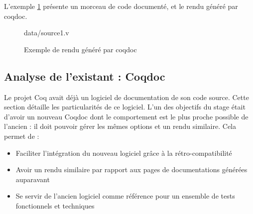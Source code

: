 \documentclass[a4paper, 11pt]{report}
\begin{document}
    L'exemple \cref{fig1} présente un morceau de code documenté, et le rendu
    généré par coqdoc.

    \begin{figure}
      
        {data/source1.v}
      \caption{Exemple de rendu généré par coqdoc}
      \label{fig1}
    \end{figure}

    \clearpage

    \subsection{Analyse de l'existant : Coqdoc}
    Le projet Coq avait déjà un logiciel de documentation de son code source.
    Cette section détaille les particularités de ce logiciel. L'un des objectifs
    du stage était d'avoir un nouveau Coqdoc dont le comportement est le plus
    proche possible de l'ancien : il doit pouvoir gérer les mêmes options et
    un rendu similaire. Cela permet de :
    \begin{itemize}
      \item Faciliter l'intégration du nouveau logiciel grâce à la
        rétro-compatibilité
      \item Avoir un rendu similaire par rapport aux pages de documentations
        générées auparavant
      \item Se servir de l'ancien logiciel comme référence pour un ensemble
        de tests fonctionnels et techniques
    \end{itemize}
\end{document}
